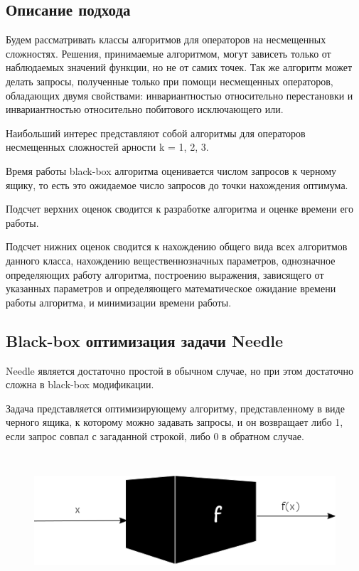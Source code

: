 \subsection{Описание подхода}
Будем рассматривать классы алгоритмов для операторов на несмещенных сложностях. Решения, принимаемые алгоритмом, могут зависеть только от наблюдаемых значений функции, но не от самих точек. Так же алгоритм может делать  запросы, полученные только при помощи несмещенных операторов, обладающих двумя свойствами: инвариантностью относительно перестановки и инвариантностью относительно побитового исключающего или. 
	
Наибольший интерес представляют собой алгоритмы для операторов  несмещенных сложностей арности k = 1, 2, 3.

Время работы black-box алгоритма оценивается числом запросов к черному ящику,  то есть это ожидаемое число запросов до точки  нахождения оптимума.
	
Подсчет верхних оценок сводится к разработке алгоритма и оценке времени его работы.
	
Подсчет нижних оценок сводится к нахождению общего вида всех алгоритмов данного класса, нахождению вещественнозначных параметров, однозначное определяющих работу алгоритма, построению выражения, зависящего от указанных параметров и определяющего математическое ожидание времени работы алгоритма, и  минимизации времени работы.  

\subsection{Black-box оптимизация задачи Needle}

Needle является достаточно простой в обычном случае, но при этом достаточно сложна в black-box модификации.

Задача представляется оптимизирующему алгоритму, представленному в виде черного ящика, к  которому можно задавать запросы, и он возвращает либо 1, если запрос совпал с загаданной строкой, либо 0 в обратном случае. 

\begin{figure}[H]
\caption{}\label{fig3}
    \includegraphics[height=5cm]{ITMO/pic/blackbox.png}
\end{figure}

